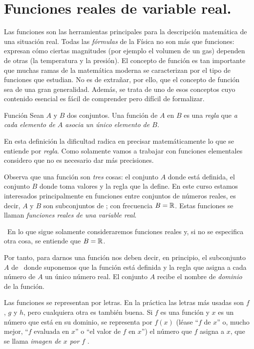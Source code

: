 \vspace*{-1mm}


\section{Funciones reales de variable real.}

Las funciones son las herramientas principales para la descripción
matemática de una situación real. Todas las \emph{fórmulas} de la
Física no son más que funciones: expresan cómo ciertas magnitudes
(por ejemplo el volumen de un gas) dependen de otras (la temperatura
y la presión). El concepto de función es tan importante que muchas
ramas de la matemática moderna se caracterizan por el tipo de funciones
que estudian. No es de extrañar, por ello, que el concepto de función
sea de una gran generalidad. Además, se trata de uno de esos conceptos
cuyo contenido esencial es fácil de comprender pero difícil de formalizar.

\begin{defi}{Función}{} Sean $A$ y $B$ dos conjuntos. Una función
de $A$ en $B$ es una \emph{regla} que \emph{a cada elemento de $A$
asocia un único elemento de $B$.} \end{defi}

En esta definición la dificultad radica en precisar matemáticamente
lo que se entiende por \emph{regla}. Como solamente vamos a trabajar
con funciones elementales considero que no es necesario dar más precisiones.

Observa que una función son \emph{tres} cosas: el conjunto $A$ donde
está definida, el conjunto $B$ donde toma valores y la regla que
la define. En este curso estamos interesados principalmente en funciones
entre conjuntos de números reales, es decir, $A$ y $B$ son subconjuntos
de \R; con frecuencia $B=\mathbb R$. Estas funciones se llaman \emph{funciones
reales de una variable real}.

\ En lo que sigue solamente consideraremos
funciones reales y, si no se especifica otra cosa, se entiende que
$B=\mathbb R$.

Por tanto, para darnos una función nos deben decir, en principio,
el subconjunto $A$ de \R\ donde suponemos que la función está definida
y la regla que asigna a cada número de $A$ un único número real.
El conjunto $A$ recibe el nombre de \emph{dominio} de la función.

Las funciones se representan por letras. En la práctica las letras
más usadas son $f$, $g$ y $h$, pero cualquiera otra es también
buena. Si $f$ es una función y $x$ es un número que está en su dominio,
se representa por $f(x)$ (léase ``$f$ de $x$'' o, mucho mejor,
``$f$ evaluada en $x$'' o ``el valor de $f$ en $x$'') el número
que $f$ asigna a $x$, que se llama \emph{imagen de $x$ por $f$
}.

